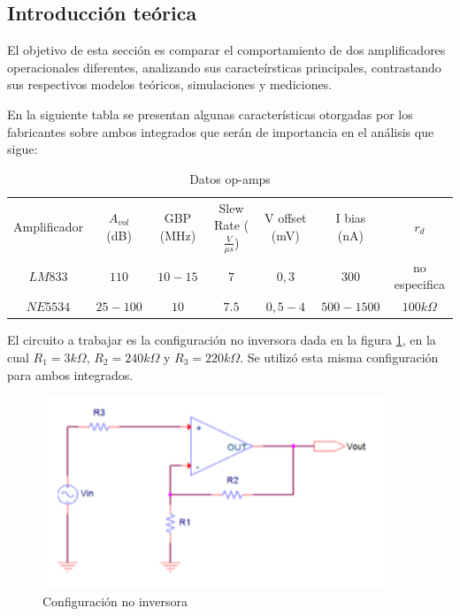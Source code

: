 
\subsection{Introducción teórica}


El objetivo de esta sección es comparar el comportamiento de dos amplificadores operacionales diferentes, analizando sus caracteírsticas principales, contrastando sus respectivos modelos teóricos, simulaciones y mediciones.

En la siguiente tabla se presentan algunas características otorgadas por los fabricantes sobre ambos integrados que serán de importancia en el  análisis que sigue:


\begin{table}[H]
\begin{center}
\begin{tabular}{|c|c|c|c|c|c|c|}
\hline
Amplificador   & $A_{vol}$ (dB)   & GBP (MHz)   & Slew Rate ($\frac{V}{\mu s}$)   & V offset (mV)  & I bias (nA)  & $r_d$ \\ %
$LM833$ & $110$ & $10-15$ & $7$   & $0,3$  & $300$ & no especifica \\ \hline
$NE5534$ & $25-100$    & $10$  & $7.5$   & $0,5-4$  & $500-1500$ &  $100k\Omega$
\\ \hline
\end{tabular}
\caption{Datos op-amps}
\label{tabla:caracteristicas_amps}
\end{center}
\end{table}

El circuito a trabajar es la configuración no inversora dada en la figura \ref{fig:consigna}, en la cual $R_1 = 3k \Omega$, $R_2 = 240k \Omega$ y $R_3 = 220k \Omega$. Se utilizó esta misma configuración para ambos integrados.  


\begin{figure}[H]	
	\centering
	\includegraphics[width=\textwidth]{Ejercicio2/Imagenes/circuito_consigna.png}
	\caption{Configuración no inversora}
	\label{fig:consigna}
\end{figure}

